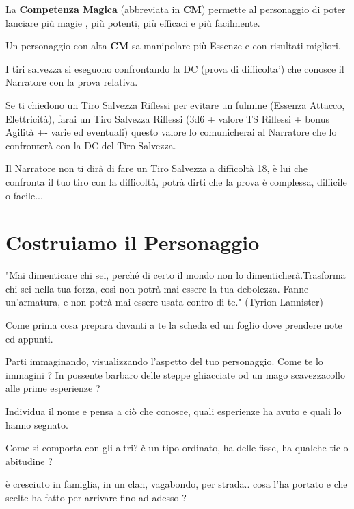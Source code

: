 \documentclass[a4paper,11pt,twoside,openany]{book}
\begin{document}
La \textbf{Competenza Magica} (abbreviata in \textbf{CM}) permette al personaggio di poter lanciare più magie , più potenti, più efficaci e più facilmente.

Un personaggio con alta \textbf{CM} sa manipolare più Essenze e con risultati migliori.

I tiri salvezza si eseguono confrontando la DC (prova di difficolta') che conosce il Narratore con la prova relativa.

Se ti chiedono un Tiro Salvezza Riflessi per evitare un fulmine (Essenza Attacco, Elettricità), farai un Tiro Salvezza Riflessi (3d6 + valore TS Riflessi + bonus Agilità +- varie ed eventuali) questo valore lo comunicherai al Narratore che lo confronterà con la DC del Tiro Salvezza.

Il Narratore non ti dirà di fare un Tiro Salvezza a difficoltà 18, è lui che confronta il tuo tiro con la difficoltà, potrà dirti che la prova è complessa, difficile o facile...


\pagebreak

\section{Costruiamo il Personaggio}

\label{costruiamo-il-personaggio}
\begin{tcolorbox}[enhanced,arc=5pt,boxrule=0.3pt]{
		"Mai dimenticare chi sei, perché di certo il mondo non lo dimenticherà.Trasforma chi sei nella tua forza, così non potrà mai essere la tua debolezza. Fanne un'armatura, e non potrà mai essere usata contro di te." (Tyrion Lannister)
	}\end{tcolorbox}\medskip

Come prima cosa prepara davanti a te la scheda ed un foglio dove prendere note ed appunti.

Parti immaginando, visualizzando l'aspetto del tuo personaggio. Come te lo immagini ? In possente barbaro delle steppe ghiacciate od un mago scavezzacollo alle prime esperienze ?

Individua il nome e pensa a ciò che conosce, quali esperienze ha avuto e quali lo hanno segnato.

Come si comporta con gli altri? è un tipo ordinato, ha delle fisse, ha qualche tic o abitudine ?

è cresciuto in famiglia, in un clan, vagabondo, per strada.. cosa l'ha portato e che scelte ha fatto per arrivare fino ad adesso ?
\end{document}
